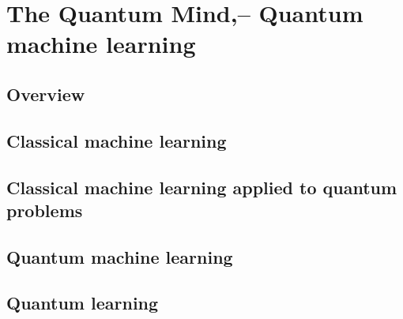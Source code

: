 %
%

\section{The Quantum Mind\texttrademark,-- Quantum machine learning}\label{sec:quantum_mind}

\cite{bib:lloyd2013quantum}


\subsection{Overview}

\subsection{Classical machine learning}

\subsection{Classical machine learning applied to quantum problems}

\subsection{Quantum machine learning}

\subsection{Quantum learning}
